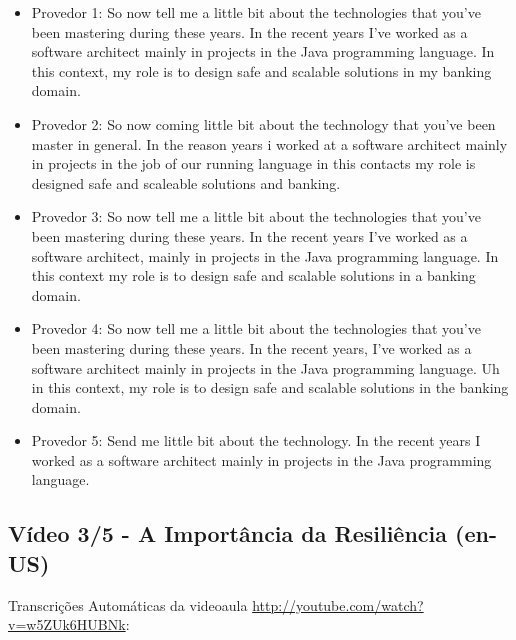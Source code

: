 \begin{itemize}
    \item Provedor 1: So now tell me a little bit about the technologies that you've been mastering during these years. In the recent years I've worked as a software architect mainly in projects in the Java programming language. In this context, my role is to design safe and scalable solutions in my banking domain.
    \item Provedor 2: So now coming little bit about the technology that you've been master in general. In the reason years i worked at a software architect mainly in projects in the job of our running language in this contacts my role is designed safe and scaleable solutions and banking.
    \item Provedor 3: So now tell me a little bit about the technologies that you've been mastering during these years. In the recent years I've worked as a software architect, mainly in projects in the Java programming language. In this context my role is to design safe and scalable solutions in a banking domain.
    \item Provedor 4: So now tell me a little bit about the technologies that you've been mastering during these years. In the recent years, I've worked as a software architect mainly in projects in the Java programming language. Uh in this context, my role is to design safe and scalable solutions in the banking domain.
    \item Provedor 5: Send me little bit about the technology. In the recent years I worked as a software architect mainly in projects in the Java programming language.
\end{itemize}

\subsection{Vídeo 3/5 - A Importância da Resiliência (en-US)}

\noindent
Transcrições Automáticas da videoaula \url{http://youtube.com/watch?v=w5ZUk6HUBNk}:

